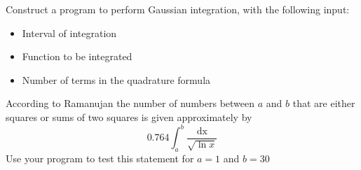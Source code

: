 \begin{problem}
Construct a program to perform Gaussian integration, with the following input:
\begin{itemize}
\item Interval of integration
\item Function to be integrated
\item Number of terms in the quadrature formula
\end{itemize}
According to Ramanujan the number of numbers between $a$ and $b$ that
are either squares or sums of two squares is given approximately by
\begin{equation*}
0.764\int_a^b \frac{\text{dx}}{\sqrt{\ln x}}
\end{equation*}
Use your program to test this statement for $a=1$ and $b=30$
\end{problem}

